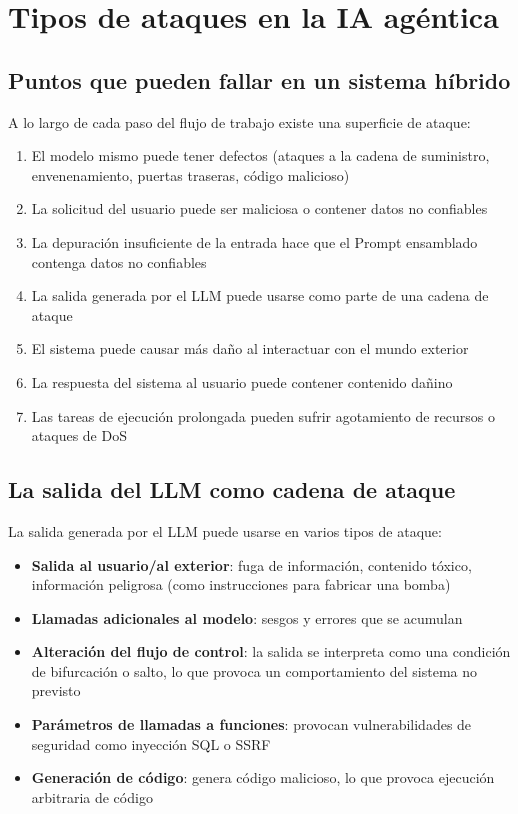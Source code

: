 \section{Tipos de ataques en la IA agéntica}

\subsection{Puntos que pueden fallar en un sistema híbrido}

A lo largo de cada paso del flujo de trabajo existe una superficie de ataque:
\begin{enumerate}
    \item El modelo mismo puede tener defectos (ataques a la cadena de suministro, envenenamiento, puertas traseras, código malicioso)
    \item La solicitud del usuario puede ser maliciosa o contener datos no confiables
    \item La depuración insuficiente de la entrada hace que el Prompt ensamblado contenga datos no confiables
    \item La salida generada por el LLM puede usarse como parte de una cadena de ataque
    \item El sistema puede causar más daño al interactuar con el mundo exterior
    \item La respuesta del sistema al usuario puede contener contenido dañino
    \item Las tareas de ejecución prolongada pueden sufrir agotamiento de recursos o ataques de DoS
\end{enumerate}

\subsection{La salida del LLM como cadena de ataque}

La salida generada por el LLM puede usarse en varios tipos de ataque:
\begin{itemize}
    \item \textbf{Salida al usuario/al exterior}: fuga de información, contenido tóxico, información peligrosa (como instrucciones para fabricar una bomba)
    \item \textbf{Llamadas adicionales al modelo}: sesgos y errores que se acumulan
    \item \textbf{Alteración del flujo de control}: la salida se interpreta como una condición de bifurcación o salto, lo que provoca un comportamiento del sistema no previsto
    \item \textbf{Parámetros de llamadas a funciones}: provocan vulnerabilidades de seguridad como inyección SQL o SSRF
    \item \textbf{Generación de código}: genera código malicioso, lo que provoca ejecución arbitraria de código
\end{itemize}


